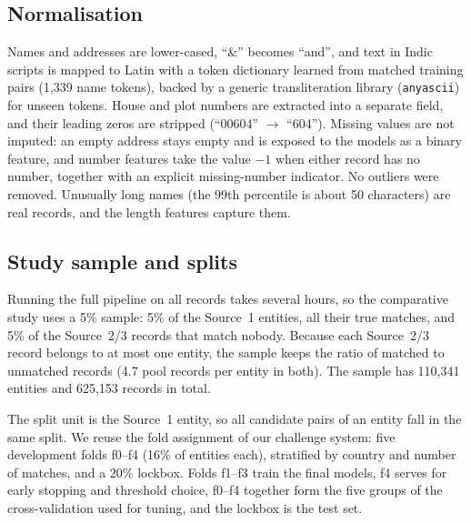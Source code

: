 \subsection{Normalisation}
Names and addresses are lower-cased, ``\&'' becomes ``and'', and text in Indic scripts is mapped to Latin with a token
dictionary learned from matched training pairs (1,339 name tokens), backed by a generic transliteration library
(\texttt{anyascii}) for unseen tokens. House and plot numbers are extracted into a separate field, and their
leading zeros are stripped (``00604'' $\rightarrow$ ``604''). Missing values are not imputed: an empty address
stays empty and is exposed to the models as a binary feature, and number features take the value $-1$ when either
record has no number, together with an explicit missing-number indicator. No outliers were removed. Unusually long
names (the 99th percentile is about 50 characters) are real records, and the length features capture them.

\subsection{Study sample and splits}
Running the full pipeline on all records takes several hours, so the comparative study uses a 5\% sample: 5\%
of the Source~1 entities, all their true matches, and 5\% of the Source~2/3 records that match nobody. Because
each Source~2/3 record belongs to at most one entity, the sample keeps the ratio of matched to unmatched records
(4.7 pool records per entity in both). The sample has 110,341 entities and 625,153 records in total.

The split unit is the Source~1 entity, so all candidate pairs of an entity fall in the same split. We reuse the
fold assignment of our challenge system: five development folds f0--f4 (16\% of entities each), stratified by
country and number of matches, and a 20\% lockbox. Folds f1--f3 train the final models, f4 serves for early
stopping and threshold choice, f0--f4 together form the five groups of the cross-validation used for tuning, and
the lockbox is the test set.


